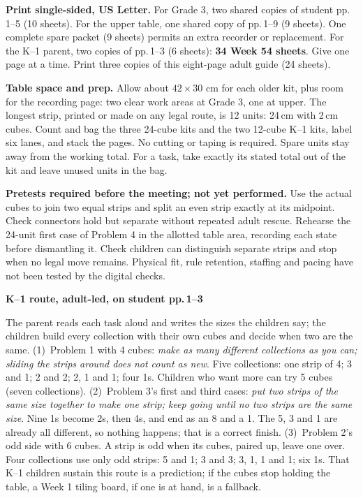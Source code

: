 \documentclass[letterpaper,11pt]{article}
\newcommand{\subhead}[1]{\vspace{3pt}\textbf{#1}\par}
\begin{document}
\textbf{Print single-sided, US Letter.} For Grade 3, two shared copies of student pp.\,1--5 (10 sheets). For the upper table, one shared copy of pp.\,1--9 (9 sheets). One complete spare packet (9 sheets) permits an extra recorder or replacement. For the K--1 parent, two copies of pp.\,1--3 (6 sheets): \textbf{34 Week 54 sheets}. Give one page at a time. Print three copies of this eight-page adult guide (24 sheets).

\textbf{Table space and prep.} Allow about $42\times30$ cm for each older kit, plus room for the recording page: two clear work areas at Grade 3, one at upper. The longest strip, printed or made on any legal route, is 12 units: 24\,cm with 2\,cm cubes. Count and bag the three 24-cube kits and the two 12-cube K--1 kits, label six lanes, and stack the pages. No cutting or taping is required. Spare units stay away from the working total. For a task, take exactly its stated total out of the kit and leave unused units in the bag.

\textbf{Pretests required before the meeting; not yet performed.} Use the actual cubes to join two equal strips and split an even strip exactly at its midpoint. Check connectors hold but separate without repeated adult rescue. Rehearse the 24-unit first case of Problem 4 in the allotted table area, recording each state before dismantling it. Check children can distinguish separate strips and stop when no legal move remains. Physical fit, rule retention, staffing and pacing have not been tested by the digital checks.

\subhead{K--1 route, adult-led, on student pp.\,1--3}
The parent reads each task aloud and writes the sizes the children say; the children build every collection with their own cubes and decide when two are the same. (1)~Problem 1 with 4 cubes: \emph{make as many different collections as you can; sliding the strips around does not count as new}. Five collections: one strip of 4; 3 and 1; 2 and 2; 2, 1 and 1; four 1s. Children who want more can try 5 cubes (seven collections). (2)~Problem 3's first and third cases: \emph{put two strips of the same size together to make one strip; keep going until no two strips are the same size}. Nine 1s become 2s, then 4s, and end as an 8 and a 1. The 5, 3 and 1 are already all different, so nothing happens; that is a correct finish. (3)~Problem 2's odd side with 6 cubes. A strip is odd when its cubes, paired up, leave one over. Four collections use only odd strips: 5 and 1; 3 and 3; 3, 1, 1 and 1; six 1s. That K--1 children sustain this route is a prediction; if the cubes stop holding the table, a Week 1 tiling board, if one is at hand, is a fallback.
\end{document}
